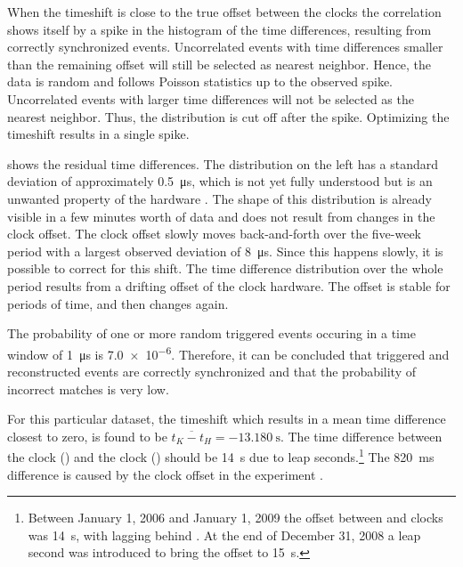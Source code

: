 When the timeshift is close to the true offset between the clocks the
correlation shows itself by a spike in the histogram of the time differences,
resulting from correctly synchronized events.  Uncorrelated events with time
differences smaller than the remaining offset will still be selected as
nearest neighbor.  Hence, the data is random and follows Poisson statistics up to the observed spike.
Uncorrelated events with larger time differences will not be selected as the
nearest neighbor.  Thus, the distribution is cut off after the spike.
Optimizing the timeshift results in a single spike.

 shows the residual time differences.  The
distribution on the left has a standard deviation of approximately
\SI{.5}{\micro\second}, which is not yet fully understood but is an unwanted
property of the \kascade hardware \cite{Schieler:2010-clock}.
The shape of this distribution is already visible in a few minutes worth of data
and does not result from changes in the clock offset.  The clock offset slowly
moves back-and-forth over the five-week period with a largest observed deviation
of \SI{8}{\micro\second}.  Since this happens slowly, it is possible to correct
for this shift.  The time difference distribution over the whole period results
from a drifting offset of the \kascade clock hardware.  The offset is stable for
periods of time, and then changes again.

The probability of one or more random triggered events occuring in a time window
of \SI{1}{\micro\second} is \num{7.0e-6}.  Therefore, it can be concluded that
triggered and reconstructed events are correctly synchronized and that the
probability of incorrect matches is very low.

For this particular dataset, the timeshift which results in a mean time
difference closest to zero, is found to be $\overline{t_K - t_H} =
\SI{-13.180}{\second}$.  The time difference between the \hisparc clock
() and the \kascade clock () should be
\SI{14}{\second} due to leap seconds.\footnote{Between January 1, 2006 and
January 1, 2009 the offset between  and 
clocks was \SI{14}{\second}, with  lagging behind
.  At the end of December 31, 2008 a leap second was introduced
to bring the offset to \SI{15}{\second}.}  The \SI{820}{\milli\second}
difference is caused by the clock offset in the \kascade experiment
\cite{Schieler:2010-clock}.


